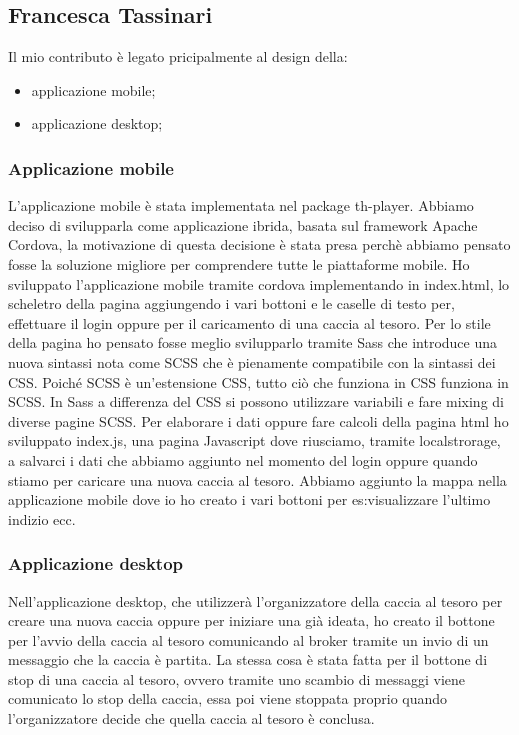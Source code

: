 \documentclass[12pt, italian]{article}
\begin{document}
\subsection{Francesca Tassinari}
Il mio contributo è legato pricipalmente al design della:
\begin{itemize}
	\item applicazione mobile;
	\item applicazione desktop;
\end{itemize}
\subsubsection{Applicazione mobile}
L'applicazione mobile è stata implementata nel package th-player. Abbiamo deciso di svilupparla come applicazione ibrida, basata sul framework Apache Cordova, la motivazione di questa decisione è stata presa perchè abbiamo pensato fosse la soluzione migliore per comprendere tutte le piattaforme mobile. Ho sviluppato l'applicazione mobile tramite cordova implementando in index.html, lo scheletro della pagina aggiungendo i vari bottoni e le caselle di testo per, effettuare il login oppure per il caricamento di una caccia al tesoro. Per lo stile della pagina ho pensato fosse meglio svilupparlo tramite Sass che introduce una nuova sintassi nota come SCSS che è pienamente compatibile con la sintassi dei CSS. Poiché SCSS è un'estensione CSS, tutto ciò che funziona in CSS funziona in SCSS. In Sass a differenza del CSS si possono utilizzare variabili e fare mixing di diverse pagine SCSS. Per elaborare i dati oppure fare calcoli della pagina html ho sviluppato index.js, una pagina Javascript dove riusciamo, tramite localstrorage, a salvarci i dati che abbiamo aggiunto nel momento del login oppure quando stiamo per caricare una nuova caccia al tesoro. Abbiamo aggiunto la mappa nella applicazione mobile dove io ho creato i vari bottoni per es:visualizzare l'ultimo indizio ecc.
\subsubsection {Applicazione desktop}
Nell'applicazione desktop, che utilizzerà l'organizzatore della caccia al tesoro per creare una nuova caccia oppure per iniziare una già ideata, ho creato il bottone per l'avvio della caccia al tesoro comunicando al broker tramite un invio di un messaggio che la caccia è partita. La stessa cosa è stata fatta per il bottone di stop di una caccia al tesoro, ovvero tramite uno scambio di messaggi viene comunicato lo stop della caccia, essa poi viene stoppata proprio quando l'organizzatore decide che quella caccia al tesoro è conclusa.
\end{document}
